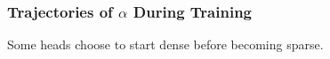 \documentclass[xetex,aspectratio=169,xcolor,professionalfonts,hyperref]{beamer}
\begin{document}
\begin{frame}
    \frametitle{Trajectories of $\alpha$  During Training}

    \centering\fontsize{10pt}{15}\selectfont\vspace{-0.5cm}
    

    \bigskip

    \fontsize{12pt}{15}\selectfont
    Some heads choose to start dense before becoming sparse.

\end{frame}


%     
\end{document}
